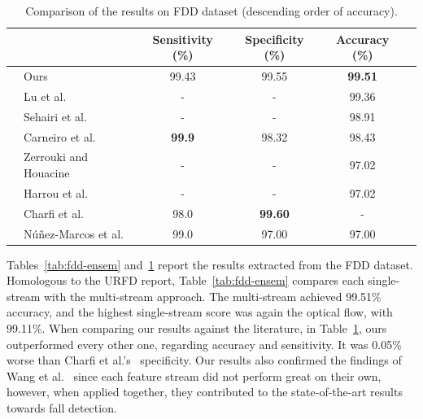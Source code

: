 \documentclass[10pt, conference, compsocconf]{IEEEtran}
\begin{document}
\begin{table}[!htb]
\centering
\caption{Comparison of the results on FDD dataset (descending order of accuracy).}
\label{tab:fdd-our-their}
\begin{tabular}{llcccl}
\hline
 &                                                      & Sensitivity (\%)  & Specificity (\%)  & Accuracy (\%)     & \\ \hline
 & Ours                                                 & 99.43    & 99.55             & \textbf{99.51}    & \\
 & Lu et al.~\cite{lu2018deep}                          & -                 & -                 & 99.36             & \\
 & Sehairi et al.~\cite{sehairi2018elderly}             & -                 & -                 & 98.91             & \\
 & Carneiro et al.~\cite{carneiro2019multi}                                                 & \textbf{99.9}      & 98.32    & 98.43             & \\
 & Zerrouki and Houacine~\cite{zerrouki2018combined}    & -                 & -                 & 97.02             & \\
 & Harrou et al.~\cite{harrou2017vision}                & -                 & -                 & 97.02             & \\
 & Charfi et al.~\cite{charfi2012definition}            & 98.0              & \textbf{99.60}    & -                 & \\
 & N\'u\~nez-Marcos et al.~\cite{nunez2017vision}       & 99.0              & 97.00             & 97.00             & \\ \hline
\end{tabular}
\end{table}

Tables~\ref{tab:fdd-ensem} and~\ref{tab:fdd-our-their} report the results extracted from the FDD dataset. Homologous to the URFD report, Table~\ref{tab:fdd-ensem} compares each single-stream with the multi-stream approach. The multi-stream achieved 99.51\% accuracy, and the highest single-stream score was again the optical flow, with 99.11\%. When comparing our results against the literature, in Table~\ref{tab:fdd-our-their}, ours outperformed every other one, regarding accuracy and sensitivity. It was 0.05\% worse than Charfi et al.'s~\cite{charfi2013optimised} specificity. Our results also confirmed the findings of Wang et al.~\cite{wang2015towards} since each feature stream did not perform great on their own, however, when applied together, they contributed to the state-of-the-art results towards fall detection.
 
\end{document}
